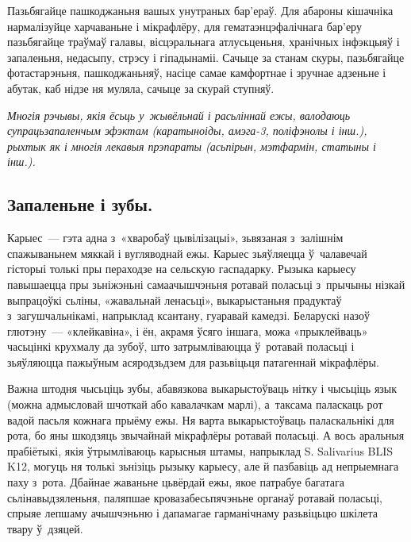 Пазьбягайце пашкоджаньня вашых унутраных бар'ераў. Для абароны кішачніка нармалізуйце харчаваньне і мікрафлёру, для гематаэнцэфалічнага бар'еру пазьбягайце траўмаў галавы, вісцэральнага атлусьценьня, хранічных інфэкцыяў і запаленьня, недасыпу, стрэсу і гіпадынаміі. Сачыце за станам скуры, пазьбягайце фотастарэньня, пашкоджаньняў, насіце самае камфортнае і зручнае адзеньне і абутак, каб нідзе ня муляла, сачыце за скурай ступняў.

\emph{Многія рэчывы, якія ёсьць у~жывёльнай і расьліннай ежы, валодаюць супрацьзапаленчым эфэктам (каратыноіды, амэга-3, поліфэнолы і інш.), рыхтык як і многія лекавыя прэпараты (асьпірын, мэтфармін, статыны і інш.).}

\subsection*{Запаленьне і зубы.} 

Карыес~--- гэта адна з~«хваробаў цывілізацыі», зьвязаная з~залішнім спажываньнем мяккай і вугляводнай ежы. Карыес зьяўляецца ў~чалавечай гісторыі толькі пры пераходзе на сельскую гаспадарку. Рызыка карыесу павышаецца пры зьніжэньні самаачышчэньня ротавай поласьці з~прычыны нізкай выпрацоўкі сьліны, «жавальнай ленасьці», выкарыстаньня прадуктаў з~загушчальнікамі, напрыклад ксантану, гуаравай камедзі. Беларускі назоў глютэну~--- «клейкавіна», і ён, акрамя ўсяго іншага, можа «прыклейваць» часьцінкі крухмалу да зубоў, што затрымліваюцца ў~ротавай поласьці і зьяўляюцца пажыўным асяродзьдзем для разьвіцьця патагеннай мікрафлёры. 


Важна штодня чысьціць зубы, абавязкова выкарыстоўваць нітку і чысьціць язык (можна адмысловай шчоткай або кавалачкам марлі), а~таксама паласкаць рот вадой пасьля кожнага прыёму ежы. Ня варта выкарыстоўваць паласкальнікі для рота, бо яны шкодзяць звычайнай мікрафлёры ротавай поласьці. А вось аральныя прабіётыкі, якія ўтрымліваюць карысныя штамы, напрыклад S. Salivarius BLIS K12, могуць ня толькі зьнізіць рызыку карыесу, але й пазбавіць ад непрыемнага паху з~рота. Дбайнае жаваньне цьвёрдай ежы, якое патрабуе багатага сьлінавыдзяленьня, паляпшае кровазабесьпячэньне органаў ротавай поласьці, спрыяе лепшаму ачышчэньню і дапамагае гарманічнаму разьвіцьцю шкілета твару ў~дзяцей.

